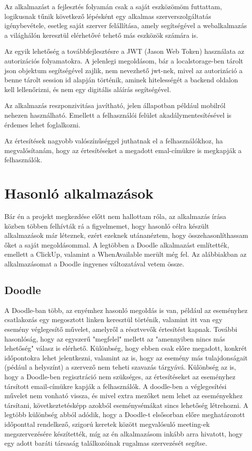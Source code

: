 \documentclass[a4paper,12pt]{report}
\theoremstyle{definition}
\theoremstyle{remark}
\begin{document}
Az alkalmazást a fejlesztés folyamán csak a saját eszközömöm futtattam, logikusnak tűnik következő lépésként egy alkalmas szerverszolgáltatás igénybevétele, esetleg saját szerver felállítása, amely segítségével a webalkalmazás a világhálón keresztül elérhetővé tehető más eszközök számára is.

Az egyik lehetőség a továbbfejlesztésre a JWT\cite{JWTwebsite} (Jason Web Token) használata az autorizációs folyamatokra. A jelenlegi megoldásom, bár a localstorage-ben tárolt json objektum segítségével zajlik, nem nevezhető jwt-nek, mivel az autorizáció a benne tárolt session id alapján történik, aminek hitelességét a backend oldalon kell lellenőrizni, és nem egy digitális aláírás segítségével.

Az alkalmazás reszponzivitása javítható, jelen állapotban például mobilról nehezen használható. Emellett a felhasználói felület akadálymentesítésével is érdemes lehet foglalkozni.

Az értesítések nagyobb valószínűséggel juthatnak el a felhasználókhoz, ha megvalósítanám, hogy az értesítéseket a megadott emal-címükre is megkapják a felhasználók.

\chapter{Hasonló alkalmazások}

Bár én a projekt megkezdése előtt nem hallottam róla, az alkalmazás írása közben többen felhívták rá a figyelmemet, hogy hasonló célra készült alkalmazások már léteznek, ezért ezeknek utánanéztem, hogy összehasonlíthassam őket a saját megoldásommal. A legtöbben a Doodle alkalmazást említették, emellett a ClickUp, valamint a WhenAvailable merült még fel. Az alábbiakban az alkalmazásomat a Doodle\cite{DoodleWebsite} ingyenes változatával vetem össze.

\section{Doodle}

A Doodle-ban több, az enyémhez hasonló megoldás is van, például az eseményhez csatlakozás egy megosztott linken keresztül történik, valamint itt van egy esemény véglegesítő művelet, amelyről a résztvevők értesítést kapnak.  További hasonlóság, hogy az egyszerű "megfelel" mellett az "amennyiben nincs más lehetőség" válasz is elérhető. Különbség, hogy ebben csak előre megadott, konkrét időpontokra lehet jelentkezni, valamint az is, hogy az esemény más tulajdonságait (pédául a helyszínt) a szervező nem teheti szavazás tárgyává. Különbség az is, hogy a Doodle-ben regisztráció nem szükséges, az értesítéseket az eseményhez társított email-címükre kapják a felhasználók. A doodle-ben a véglegesítési művelet nem vonható vissza, és mivel extra mezőket nem lehet az eseményekhez társítani, következtetésképp azokból eseménysémákat sincs lehetőség létrehozni. A legtöbb különbség abból adódik, hogy a Doodle-t elsősorban előre meghatározott időponttal rendelkező, szigorú keretek között megvalósuló meeting-ek megszervezésére készítették, míg az én alkalmazásom inkább arra hivatott, hogy egy adott baráti társaság találkozóinak rugalmas szervezését segítse.
\end{document}
